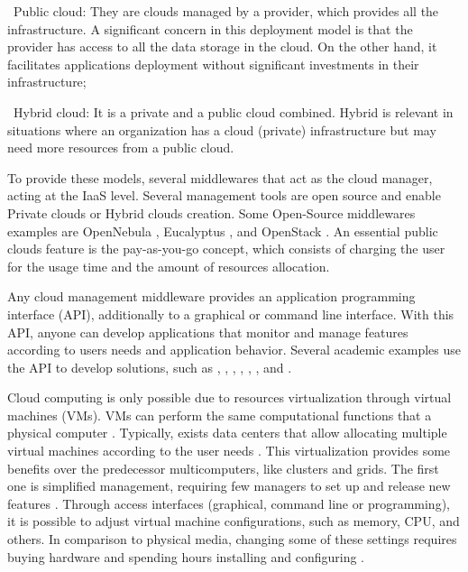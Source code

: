 \textbullet\ Public cloud: They are clouds managed by a provider, which provides all the infrastructure. A significant concern in this deployment model is that the provider has access to all the data storage in the cloud. On the other hand, it facilitates applications deployment without significant investments in their infrastructure;

\textbullet\ Hybrid cloud: It is a private and a public cloud combined. Hybrid is relevant in situations where an organization has a cloud (private) infrastructure but may need more resources from a public cloud.

To provide these models, several middlewares that act as the cloud manager, acting at the IaaS level. Several management tools are open source and enable Private clouds or Hybrid clouds creation. Some Open-Source middlewares examples are OpenNebula \cite{Moreno-Vozmediano2012IaaSInfrastructures}, Eucalyptus \cite{Nurmi2009TheSystem}, and OpenStack \cite{Sefraoui2012OpenStack:Computing}. An essential public clouds feature is the pay-as-you-go concept, which consists of charging the user for the usage time and the amount of resources allocation.

Any cloud management middleware provides an application programming interface (API), additionally to a graphical or command line interface. With this API, anyone can develop applications that monitor and manage features according to users needs and application behavior. Several academic examples use the API to develop solutions, such as \cite{DaRosaRighi2016Autoelastic:Cloud}, \cite{Molto2013ElasticRequirements}, \cite{Spinner2014RuntimeEstimation}, \cite{Beernaert2012AutomaticOpenStack}, \cite{Roy2011EfficientForecasting}, \cite{Loff2014Vadara:Applications}, and \cite{Rosa2014AnMechanisms}.

Cloud computing is only possible due to resources virtualization through virtual machines (VMs). VMs can perform the same computational functions that a physical computer \cite{Birman2012GuideSystems}. Typically, exists data centers that allow allocating multiple virtual machines according to the user needs \cite{Marinescu2013CloudPractice}. This virtualization provides some benefits over the predecessor multicomputers, like clusters and grids. The first one is simplified management, requiring few managers to set up and release new features \cite{Birman2012GuideSystems}. Through access interfaces (graphical, command line or programming), it is possible to adjust virtual machine configurations, such as memory, CPU, and others. In comparison to physical media, changing some of these settings requires buying hardware and spending hours installing and configuring \cite{Birman2012GuideSystems}.


